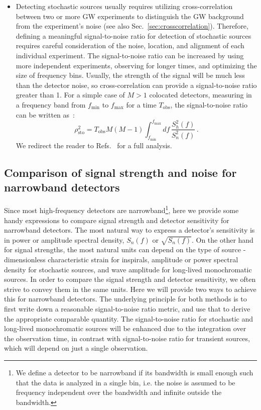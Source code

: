 \documentclass[11pt,a4paper]{article}
\begin{document}
\begin{itemize}
\item Detecting stochastic sources usually requires utilizing cross-correlation between two or more GW experiments to distinguish the GW background from the experiment's noise (see also Sec.~\ref{sec:crosscorrelation}). Therefore, defining a meaningful signal-to-noise ratio for detection of stochastic sources requires careful consideration of the noise, location, and alignment of each individual experiment. The signal-to-noise ratio can be increased by using more independent experiments, observing for longer times, and optimizing the size of frequency bins. Usually, the strength of the signal will be much less than the detector noise, so cross-correlation can provide a signal-to-noise ratio greater than 1.
For a simple case of $M>1$ colocated detectors, measuring in a frequency band from $f_\mathrm{min}$ to $f_\mathrm{max}$ for a time $T_\mathrm{obs}$, the signal-to-noise ratio can be written as~\cite{Thrane:2013_sen}:
\begin{equation}
    \rho^2_\mathrm{sto} = T_\mathrm{obs} M(M-1) \int_{f_\mathrm{min}}^{f_\mathrm{max}} df\, \frac{S^2_h(f)}{S^2_n(f)} \,\label{eq:SNRsto}.
\end{equation}
We redirect the reader to Refs.~\cite{Allen:1999stochastic,Thrane:2013_sen,Romano:2017Detection} for a full analysis.
\end{itemize}

\subsection{Comparison of signal strength and noise for narrowband detectors}
\label{sec:ComparisonSignalStrength}

Since most high-frequency detectors are narrowband\footnote{We define a detector to be narrowband if its bandwidth is small enough such that the data is analyzed in a single bin, i.e. the noise is assumed to be frequency independent over the bandwidth and infinite outside the bandwidth.}, here we provide some handy expressions to compare signal strength and detector sensitivity for narrowband detectors. The most natural way to express a detector's sensitivity is in power or amplitude spectral density, \(S_n(f)\) or \(\sqrt{S_n(f)}\). On the other hand for signal strengths, the most natural units can depend on the type of source - dimensionless characteristic strain for inspirals, amplitude or power spectral density for stochastic sources, and wave amplitude for long-lived monochromatic sources. In order to compare the signal strength and detector sensitivity, we often strive to convey them in the same units. Here we will provide two ways to achieve this for narrowband detectors. The underlying principle for both methods is to first write down a reasonable signal-to-noise ratio metric, and use that to derive the appropriate comparable quantity. The signal-to-noise ratio for stochastic and long-lived monochromatic sources will be enhanced due to the integration over the observation time, in contrast with signal-to-noise ratio for transient sources, which will depend on just a single observation.
\end{document}
